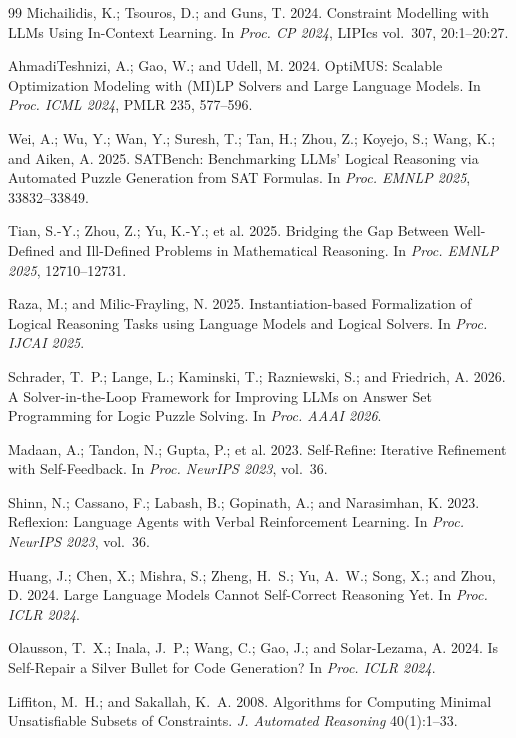\documentclass[letterpaper]{article}
\begin{document}
\begin{thebibliography}{99}
Michailidis, K.; Tsouros, D.; and Guns, T. 2024.
Constraint Modelling with LLMs Using In-Context Learning.
In \textit{Proc. CP 2024}, LIPIcs vol.~307, 20:1--20:27.

AhmadiTeshnizi, A.; Gao, W.; and Udell, M. 2024.
OptiMUS: Scalable Optimization Modeling with (MI)LP Solvers and Large
Language Models. In \textit{Proc. ICML 2024}, PMLR 235, 577--596.

Wei, A.; Wu, Y.; Wan, Y.; Suresh, T.; Tan, H.; Zhou, Z.; Koyejo, S.;
Wang, K.; and Aiken, A. 2025.
SATBench: Benchmarking LLMs' Logical Reasoning via Automated Puzzle
Generation from SAT Formulas. In \textit{Proc. EMNLP 2025}, 33832--33849.

Tian, S.-Y.; Zhou, Z.; Yu, K.-Y.; et al. 2025.
Bridging the Gap Between Well-Defined and Ill-Defined Problems in
Mathematical Reasoning. In \textit{Proc. EMNLP 2025}, 12710--12731.

Raza, M.; and Milic-Frayling, N. 2025.
Instantiation-based Formalization of Logical Reasoning Tasks using
Language Models and Logical Solvers.
In \textit{Proc. IJCAI 2025}.

Schrader, T.~P.; Lange, L.; Kaminski, T.; Razniewski, S.; and
Friedrich, A. 2026.
A Solver-in-the-Loop Framework for Improving LLMs on Answer Set
Programming for Logic Puzzle Solving. In \textit{Proc. AAAI 2026}.

Madaan, A.; Tandon, N.; Gupta, P.; et al. 2023.
Self-Refine: Iterative Refinement with Self-Feedback.
In \textit{Proc. NeurIPS 2023}, vol.~36.

Shinn, N.; Cassano, F.; Labash, B.; Gopinath, A.; and Narasimhan, K. 2023.
Reflexion: Language Agents with Verbal Reinforcement Learning.
In \textit{Proc. NeurIPS 2023}, vol.~36.

Huang, J.; Chen, X.; Mishra, S.; Zheng, H.~S.; Yu, A.~W.; Song, X.; and Zhou, D. 2024.
Large Language Models Cannot Self-Correct Reasoning Yet.
In \textit{Proc. ICLR 2024}.

Olausson, T.~X.; Inala, J.~P.; Wang, C.; Gao, J.; and Solar-Lezama, A. 2024.
Is Self-Repair a Silver Bullet for Code Generation?
In \textit{Proc. ICLR 2024}.

Liffiton, M.~H.; and Sakallah, K.~A. 2008. Algorithms for Computing Minimal
Unsatisfiable Subsets of Constraints. \textit{J. Automated Reasoning} 40(1):1--33.


\end{thebibliography}
\end{document}
